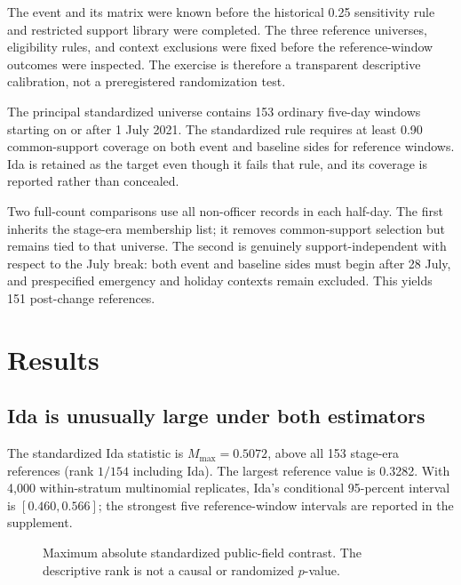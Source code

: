 \documentclass[11pt]{article}
\begin{document}
The event and its matrix were known before the historical 0.25 sensitivity rule and restricted support library were completed. The three reference universes, eligibility rules, and context exclusions were fixed before the reference-window outcomes were inspected. The exercise is therefore a transparent descriptive calibration, not a preregistered randomization test.

The principal standardized universe contains 153 ordinary five-day windows starting on or after 1 July 2021. The standardized rule requires at least 0.90 common-support coverage on both event and baseline sides for reference windows. Ida is retained as the target even though it fails that rule, and its coverage is reported rather than concealed.

Two full-count comparisons use all non-officer records in each half-day. The first inherits the stage-era membership list; it removes common-support selection but remains tied to that universe. The second is genuinely support-independent with respect to the July break: both event and baseline sides must begin after 28 July, and prespecified emergency and holiday contexts remain excluded. This yields 151 post-change references.

\section{Results}

\subsection{Ida is unusually large under both estimators}

The standardized Ida statistic is $M_{\max}=0.5072$, above all 153 stage-era references (rank $1/154$ including Ida). The largest reference value is 0.3282. With 4,000 within-stratum multinomial replicates, Ida's conditional 95-percent interval is $[0.460,0.566]$; the strongest five reference-window intervals are reported in the supplement.

\begin{figure}[t]
\centering
{}
\caption{Maximum absolute standardized public-field contrast. The descriptive rank is not a causal or randomized $p$-value.}
\label{fig:rank}
\end{figure}
\end{document}
